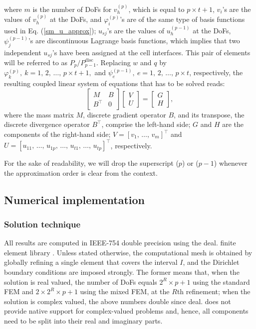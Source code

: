\documentclass[review,3p]{elsarticle}
\begin{document}
where $m$ is the number of DoFs for $v_h^{(p)}$, which is equal to $p \times t + 1$, $v_i$'s are the values of $v_h^{(p)}$ at the DoFs, and $\varphi _{i}^{(p)}$'s are of the same type of basis functions used in Eq. (\ref{sm_u_approx}); $u_{sj}$'s are the values of $u_h^{(p-1)}$ at the DoFs, $\psi _{j}^{(p-1)}$'s are discontinuous Lagrange basis functions, which implies that two independent $u_{sj}$'s have been assigned at the cell interfaces. This pair of elements will be referred to as $P_p/P_{p-1}^{\text{disc}}$. Replacing $w$ and $q$ by $\varphi _{k}^{(p)} , ~{k} = 1, \,2, \, \ldots , \, p \times t + 1, $ and $ \psi _{e}^{(p-1)} ,~ {e} = 1, \,2, \, \ldots , \, p \times t$, respectively, the resulting coupled linear system of equations that has to be solved reads:
\begin{equation}
 \left[ \begin{array}{cc} M & B  \\ B^\top & 0 \end{array}\right] \left[ \begin{array}{cc} {V} \\ {U} \end{array}\right] =\left[ \begin{array}{cc} G \\ H \end{array}\right], \label{matrix_equation_mix}
\end{equation}
where the mass matrix $M$, discrete gradient operator $B$, and its transpose, the discrete divergence operator $B^\top$, comprise the left-hand side; $G$ and $H$ are the components of the right-hand side; $V=[v_1,\,\ldots,\,v_m]^\top$ and $U=[u_{11},\,\ldots,\,u_{1p},\,\ldots,\,u_{t1},\,\ldots,\,u_{tp}]^\top$, respectively.

For the sake of readability, we will drop the superscript ($p$) or ($p-1$) whenever the approximation order is clear
from the context.

\subsection{Numerical implementation}

\subsubsection{Solution technique}

All results are computed in IEEE-754 double precision \cite{zuras2008ieee} using the deal. finite element library \cite{alzetta2018deal}. Unless stated otherwise, the computational mesh is obtained by globally refining a single element that covers the interval $I$, and the Dirichlet boundary conditions are imposed strongly. The former means that, when the solution is real valued, the number of DoFs equals $2^{R} \times p+1$ using the standard FEM and $2 \times 2^{R} \times p+1$ using the mixed FEM, at the $R$th refinement; when the solution is complex valued, the above numbers double since deal. does not provide native support for complex-valued problems and, hence, all components need to be split into their real and imaginary parts.
\end{document}

